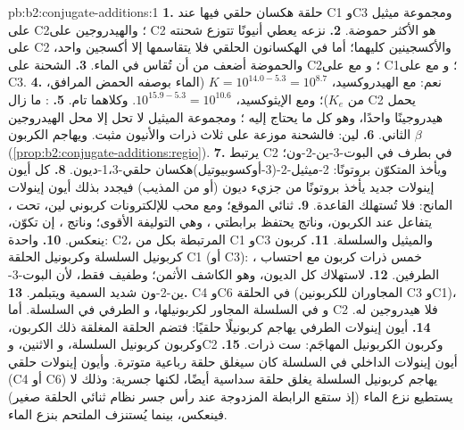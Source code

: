 \begin{solution}{pb:b2:conjugate-additions:1}
\textbf{1.} حلقة هكسان حلقي فيها  عند C1 وC3 ومجموعة ميثيل على C2؛ والهيدروجين على C2
هو الأكثر حموضة.
\textbf{2.} نزعه يعطي أنيونًا تتوزع شحنته على C2 والأكسجينين كليهما؛ أما في
الهكسانون الحلقي فلا يتقاسمها إلا أكسجين واحد، والحموضة أضعف من أن تُقاس في الماء.
\textbf{3.} الشحنة على C2؛ و مع  على C1؛ و مع  على C3.
\textbf{4.} نعم: مع الهيدروكسيد، $K = 10^{14.0 - 5.3} = 10^{8.7}$ (الماء بوصفه الحمض المرافق، من
$K_e$)؛ ومع الإيثوكسيد، $10^{15.9-5.3} = 10^{10.6}$. وكلاهما تام.
\textbf{5.} : ما زال C2 يحمل هيدروجينًا واحدًا، وهو كل ما يحتاج إليه ؛ ومجموعة
الميثيل لا تحل إلا محل الهيدروجين الثاني.
\textbf{6.} لين: فالشحنة موزعة على ثلاث ذرات والأنيون مثبت. ويهاجم
الكربون $\beta$ (\cref{prop:b2:conjugate-additions:regio}).
\textbf{7.} يرتبط C2 في  بطرف  في البوت-3-ين-2-ون؛ ويأخذ  المتكوّن
بروتونًا: 2-ميثيل-2-(3-أوكسوبيوتيل)هكسان حلقي-1،3-ديون.
\textbf{8.} كل أيون إينولات جديد يأخذ بروتونًا من جزيء ديون (أو من المذيب) فيجدد بذلك
أيون إينولات المانح: فلا تُستهلك القاعدة.
\textbf{9.}  ثنائي الموقع؛ ومع محب للإلكترونات كربوني لين، تحت ، يتفاعل
عند الكربون، وناتج  يحتفظ برابطتي ، وهي التوليفة الأقوى؛ وناتج
، إن تكوّن، ينعكس.
\textbf{10.} واحدة: C2، المرتبطة بكل من C1 وC3 والميثيل والسلسلة.
\textbf{11.} كربون كربونيل السلسلة وكربونيل الحلقة C1 (أو C3): ،
خمس ذرات كربون مع احتساب الطرفين.
\textbf{12.} لاستهلاك كل الديون، وهو الكاشف الأثمن؛ وطفيف فقط، لأن البوت-3-ين-2-ون
شديد السمية ويتبلمر.
\textbf{13.} C4 وC6 في الحلقة (المجاوران للكربونين C3 وC1)، و في السلسلة المجاور لكربونيلها، 
و الطرفي في السلسلة. أما C2 فلا هيدروجين له.
\textbf{14.} أيون إينولات  الطرفي يهاجم كربونيلًا حلقيًا: فتضم الحلقة المغلقة ذلك
الكربون، وكربون كربونيل السلسلة، و الاثنين، وC2 وكربون الكربونيل المهاجَم: ست ذرات.
\textbf{15.} أيون إينولات  الداخلي في السلسلة كان سيغلق حلقة رباعية متوترة. وأيون إينولات
حلقي (C4 أو C6) يهاجم كربونيل السلسلة يغلق حلقة سداسية أيضًا، لكنها جسرية: وذلك 
لا يستطيع نزع الماء (إذ ستقع الرابطة المزدوجة عند رأس جسر نظام ثنائي الحلقة صغير) فينعكس،
بينما يُستنزف  الملتحم بنزع الماء.

\end{solution}
